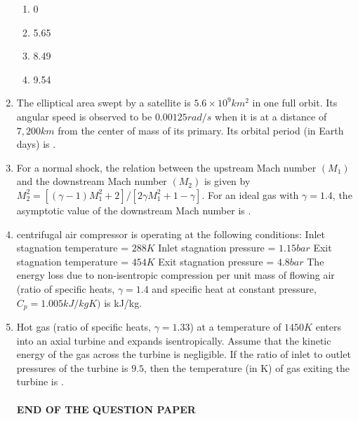 \documentclass{article}
\begin{document}
\begin{enumerate}
\begin{multicols}{4}
\begin{enumerate}
\item 0
\item 5.65
\item 8.49
\item 9.54
\end{enumerate}
\end{multicols}

\item The elliptical area swept by a satellite is $5.6 \times 10^9 km^2$ in one full orbit. Its angular speed is observed to be $0.00125 rad/s$ when it is at a distance of $7,200 km$ from the center of mass of its primary. Its orbital period (in Earth days) is \underline{\hspace{2cm}}.


\item For a normal shock, the relation between the upstream Mach number $(M_1)$ and the downstream Mach number $(M_2)$ is given by $M_2^2 = [(\gamma-1)M_1^2+2]/[2\gamma M_1^2+1-\gamma]$. For an ideal gas with $\gamma = 1.4$, the asymptotic value of the downstream Mach number is \underline{\hspace{2cm}}.


\item  centrifugal air compressor is operating at the following conditions:
Inlet stagnation temperature = $288 K$
Inlet stagnation pressure = $1.15 bar$
Exit stagnation temperature = $454 K$
Exit stagnation pressure = $4.8 bar$
The energy loss due to non-isentropic compression per unit mass of flowing air (ratio of specific heats, $\gamma = 1.4$ and specific heat at constant pressure, $C_p = 1.005 kJ/kgK)$ is \underline{\hspace{2cm}} kJ/kg.

\item Hot gas (ratio of specific heats, $\gamma = 1.33$) at a temperature of $1450 K$ enters into an axial turbine and expands isentropically. Assume that the kinetic energy of the gas across the turbine is negligible. If the ratio of inlet to outlet pressures of the turbine is $9.5$, then the temperature (in K) of gas exiting the turbine is \underline{\hspace{2cm}}.\\
\\
\large
\centering
\textbf{END OF THE QUESTION PAPER}
\end{enumerate}
\end{document}
